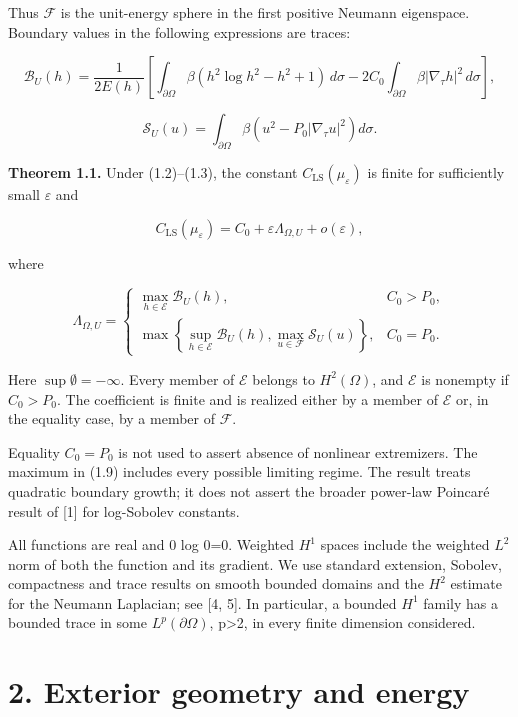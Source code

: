 \documentclass[11pt]{article}
\begin{document}
Thus \(\mathcal{F}\) is the unit-energy sphere in the first positive
Neumann eigenspace. Boundary values in the following expressions are
traces:

\[\mathcal B_U(h)=\frac1{2E(h)}
\left[\int_{\partial\Omega}\beta(h^2\log h^2-h^2+1)\,d\sigma
-2C_0\int_{\partial\Omega}\beta|\nabla_\tau h|^2\,d\sigma\right],\tag{1.6}\]

\[\mathcal S_U(u)=\int_{\partial\Omega}\beta
\left(u^2-P_0|\nabla_\tau u|^2\right)d\sigma.\tag{1.7}\]

\textbf{Theorem 1.1.} Under (1.2)--(1.3), the constant
\(C_{\mathrm{LS}}(\mu _\varepsilon )\) is finite for sufficiently small
\(\varepsilon\) and

\[C_{\mathrm{LS}}(\mu_\varepsilon)=C_0+\varepsilon\Lambda_{\Omega,U}+o(\varepsilon),\tag{1.8}\]

where

\[\Lambda_{\Omega,U}=
\begin{cases}
\displaystyle\max_{h\in\mathcal E}\mathcal B_U(h),&C_0>P_0,\\[3pt]
\displaystyle\max\left\{\sup_{h\in\mathcal E}\mathcal B_U(h),
\max_{u\in\mathcal F}\mathcal S_U(u)\right\},&C_0=P_0.
\end{cases}\tag{1.9}\]

Here \(\sup\emptyset=-\infty\). Every member of \(\mathcal{E}\) belongs
to \(H^{2}(\Omega )\), and \(\mathcal{E}\) is nonempty if \(C_0>P_0\).
The coefficient is finite and is realized either by a member of
\(\mathcal{E}\) or, in the equality case, by a member of
\(\mathcal{F}\).

Equality \(C_0=P_0\) is not used to assert absence of nonlinear
extremizers. The maximum in (1.9) includes every possible limiting
regime. The result treats quadratic boundary growth; it does not assert
the broader power-law Poincaré result of {[}1{]} for log-Sobolev
constants.

All functions are real and 0 log 0=0. Weighted \(H^{1}\) spaces include
the weighted \(L^{2}\) norm of both the function and its gradient. We
use standard extension, Sobolev, compactness and trace results on smooth
bounded domains and the \(H^{2}\) estimate for the Neumann Laplacian;
see {[}4, 5{]}. In particular, a bounded \(H^{1}\) family has a bounded
trace in some \(L^p(\partial \Omega )\), p\textgreater2, in every finite
dimension considered.

\section{2. Exterior geometry and
energy}\label{exterior-geometry-and-energy}
\end{document}

